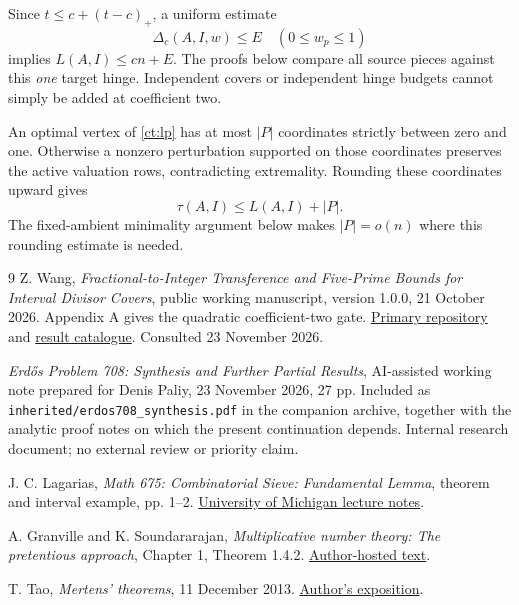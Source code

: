 \documentclass[11pt,a4paper]{article}
\theoremstyle{remark}
\begin{document}
Since \(t\le c+(t-c)_+\), a uniform estimate
\begin{equation}
 \Delta_c(A,I,w)\le E\quad(0\le w_p\le1)
 \label{ct:hinge-target}
\end{equation}
implies \(L(A,I)\le cn+E\). The proofs below compare all source
pieces against this \emph{one} target hinge. Independent covers or
independent hinge budgets cannot simply be added at coefficient two.

An optimal vertex of \eqref{ct:lp} has at most \(|P|\) coordinates
strictly between zero and one. Otherwise a nonzero perturbation
supported on those coordinates preserves the active valuation rows,
contradicting extremality. Rounding these coordinates upward gives
\begin{equation}
 \tau(A,I)\le L(A,I)+|P|.
 \label{ct:round}
\end{equation}
The fixed-ambient minimality argument below makes \(|P|=o(n)\)
where this rounding estimate is needed.









\clearpage
\begin{thebibliography}{9}
Z. Wang, \emph{Fractional-to-Integer Transference and Five-Prime
Bounds for Interval Divisor Covers}, public working manuscript,
version 1.0.0, 21 October 2026. Appendix A gives the quadratic
coefficient-two gate.
\href{https://github.com/science-prince/erdos-708-interval-divisor-covers}{Primary repository}
and \href{https://github.com/science-prince/erdos-708-interval-divisor-covers/blob/main/docs/RESULTS.md}{result catalogue}.
Consulted 23 November 2026.

\emph{Erd\H{o}s Problem 708: Synthesis and Further Partial Results},
AI-assisted working note prepared for Denis Paliy, 23 November 2026,
27 pp. Included as \texttt{inherited/erdos708\_synthesis.pdf} in the
companion archive, together with the analytic proof notes on which
the present continuation depends. Internal research document;
no external review or priority claim.

J. C. Lagarias, \emph{Math 675: Combinatorial Sieve: Fundamental
Lemma}, theorem and interval example, pp. 1--2.
\href{https://websites.umich.edu/~lagarias/675notes/Estimate5-2015.pdf}{University of Michigan lecture notes}.

A. Granville and K. Soundararajan, \emph{Multiplicative number
theory: The pretentious approach}, Chapter 1, Theorem 1.4.2.
\href{https://dms.umontreal.ca/~andrew/PDF/Book.To1.4.pdf}{Author-hosted text}.

T. Tao, \emph{Mertens' theorems}, 11 December 2013.
\href{https://terrytao.wordpress.com/2013/12/11/mertens-theorems/}{Author's exposition}.
\end{thebibliography}
\end{document}
